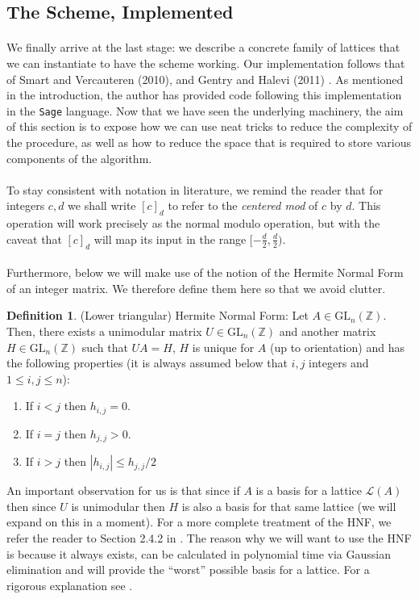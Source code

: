 \documentclass{article}
\theoremstyle{definition}
\newtheorem{definition}{Definition}[section]
\theoremstyle{example}
\renewcommand{\L}{\mathcal{L}}
\newcommand{\Int}{\mathbb{Z}}
\newcommand{\GL}{\text{GL}}
\begin{document}
\subsection{The Scheme, Implemented}
\label{sec:scheme_impl}
\paragraph{} We finally arrive at the last stage: we describe a concrete family
of lattices that we can instantiate to have the scheme working. Our
implementation follows that of Smart and Vercauteren \cite{smartImplementation}
(2010), and Gentry and Halevi (2011) \cite{gentryImplementation}. As mentioned
in the introduction, the author has provided code following this implementation
in the \texttt{Sage} language. Now that we have seen the underlying machinery,
the aim of this section is to expose how we can use neat tricks to reduce the
complexity of the procedure, as well as how to reduce the space that is required
to store various components of the algorithm.
\paragraph{} To stay consistent with notation in literature, we remind the
reader that for integers $c, d$ we shall write $[c]_d$ to refer to the
\textit{centered mod} of $c$ by $d$. This operation will work precisely as the
normal modulo operation, but with the caveat that $[c]_d$ will map its input in
the range $[-\frac{d}2, \frac{d}2)$.
\paragraph{} Furthermore, below we will make use of the notion of the Hermite
Normal Form of an integer matrix. We therefore define them here so that we avoid
clutter.
\begin{definition}{(Lower triangular) Hermite Normal Form:}
  Let $A \in \GL_n(\Int)$. Then, there exists a unimodular matrix $U \in
  \GL_n(\Int)$ and another matrix $H \in \GL_n(\Int)$ such that $UA = H$, $H$ is
  unique for $A$ (up to orientation) and has the following properties (it is
  always assumed below that $i, j$ integers and $1 \leq i, j \leq n$):
  \begin{enumerate}
    \item If $i < j$ then $h_{i, j} = 0$.
    \item If $i = j$ then $h_{j, j} > 0$.
    \item If $i > j$ then $|h_{i, j}| \leq h_{j, j}/2$
  \end{enumerate}
\end{definition}
An important observation for us is that since if $A$ is a basis for a lattice
$\L(A)$ then since $U$ is unimodular then $H$ is also a basis for that same
lattice (we will expand on this in a moment). For a more complete treatment of
the HNF, we refer the reader to Section 2.4.2 in \cite{cohen1993course}.
The reason why we will want to use the HNF is because it always exists, can be
calculated in polynomial time via Gaussian elimination and will provide the
``worst'' possible basis for a lattice. For a rigorous explanation see \cite{micciancio2001improving}.
\end{document}
